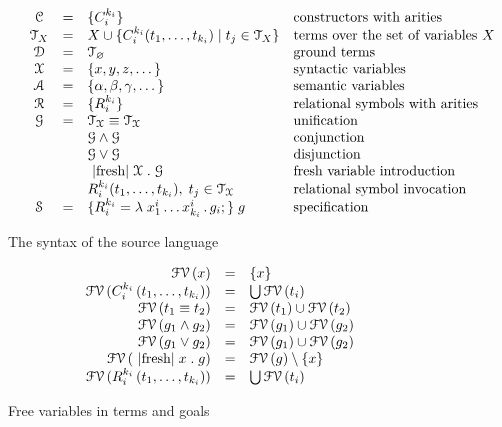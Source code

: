 \begin{figure*}[t]
\[
\begin{array}{cccll}
  &\mathcal{C} & = & \{C_i^{k_i}\} & \mbox{constructors with arities} \\
  &\mathcal{T}_X & = & X \cup \{C_i^{k_i} (t_1, \dots, t_{k_i}) \mid t_j\in\mathcal{T}_X\} & \mbox{terms over the set of variables $X$} \\
  &\mathcal{D} & = & \mathcal{T}_\emptyset & \mbox{ground terms}\\
  &\mathcal{X} & = & \{ x, y, z, \dots \} & \mbox{syntactic variables} \\
  &\mathcal{A} & = & \{ \alpha, \beta, \gamma, \dots \} & \mbox{semantic variables} \\
  &\mathcal{R} & = & \{ R_i^{k_i}\} &\mbox{relational symbols with arities} \\
  &\mathcal{G} & = & \mathcal{T_X}\equiv\mathcal{T_X}   &  \mbox{unification} \\
  &            &   & \mathcal{G}\wedge\mathcal{G}     & \mbox{conjunction} \\
  &            &   & \mathcal{G}\vee\mathcal{G}       &\mbox{disjunction} \\
  &            &   & \mbox{\lstinline|fresh|}\;\mathcal{X}\;.\;\mathcal{G} & \mbox{fresh variable introduction} \\
  &            &   & R_i^{k_i} (t_1,\dots,t_{k_i}),\;t_j\in\mathcal{T_X} & \mbox{relational symbol invocation} \\
  &\mathcal{S} & = & \{R_i^{k_i} = \lambda\;x_1^i\dots x_{k_i}^i\,.\, g_i;\}\; g & \mbox{specification}
\end{array}
\]
\caption{The syntax of the source language}
\label{syntax}
\end{figure*}

\begin{figure}[t]
\[
\begin{array}{rcl}
  \mathcal{FV}\,(x)&=&\{x\}\\
  \mathcal{FV}\,(C_i^{k_i}\,(t_1,\dots,t_{k_i}))&=&\bigcup\mathcal{FV}\,(t_i)\\
  \mathcal{FV}\,(t_1\equiv t_2)&=&\mathcal{FV}\,(t_1)\cup\mathcal{FV}\,(t_2)\\
  \mathcal{FV}\,(g_1\wedge g_2)&=&\mathcal{FV}\,(g_1)\cup\mathcal{FV}\,(g_2)\\
  \mathcal{FV}\,(g_1\vee g_2)&=&\mathcal{FV}\,(g_1)\cup\mathcal{FV}\,(g_2)\\
  \mathcal{FV}\,(\mbox{\lstinline|fresh|}\;x\;.\;g)&=&\mathcal{FV}\,(g)\setminus\{x\}\\
  \mathcal{FV}\,(R_i^{k_i}\,(t_1,\dots,t_{k_i}))&=&\bigcup\mathcal{FV}\,(t_i)
\end{array}
\]
\caption{Free variables in terms and goals}
\label{free}
\end{figure}

